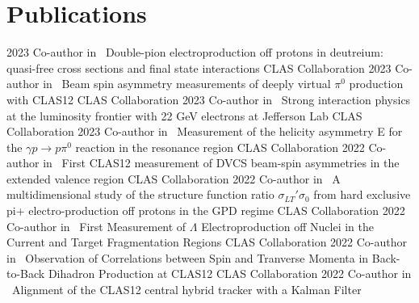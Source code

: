 \documentclass[a4paper]{cv-style}
\begin{document}
\section{Publications}
    \begin{entrylist}
        \entry
            {2023}
            {{\normalfont Co-author in} ~Double-pion electroproduction off protons in deutreium: quasi-free cross sections and final state interactions}
            {CLAS Collaboration}
            {\vspace{-0.3cm}}
        \entry
            {2023}
            {{\normalfont Co-author in} ~Beam spin asymmetry measurements of deeply virtual $\pi^0$ production with CLAS12}
            {CLAS Collaboration}
            {\vspace{-0.3cm}}
        \entry
            {2023}
            {{\normalfont Co-author in} ~Strong interaction physics at the luminosity frontier with 22 GeV electrons at Jefferson Lab}
            {CLAS Collaboration}
            {\vspace{-0.3cm}}
        \entry
            {2023}
            {{\normalfont Co-author in} ~Measurement of the helicity asymmetry E for the $\gamma p \rightarrow p\pi^0$ reaction in the resonance region}
            {CLAS Collaboration}
            {\vspace{-0.3cm}}
        \entry
            {2022}
            {{\normalfont Co-author in} ~First CLAS12 measurement of DVCS beam-spin asymmetries in the extended valence region}
            {CLAS Collaboration}
            {\vspace{-0.3cm}}
        \entry
            {2022}
            {{\normalfont Co-author in} ~A multidimensional study of the structure function ratio $\sigma_{LT}'\sigma_0$ from hard exclusive pi+ electro-production off protons in the GPD regime}
            {CLAS Collaboration}
            {\vspace{-0.3cm}}
        \entry
            {2022}
            {{\normalfont Co-author in} ~First Measurement of $\Lambda$ Electroproduction off Nuclei in the Current and Target Fragmentation Regions}
            {CLAS Collaboration}
            {\vspace{-0.3cm}}
        \entry
            {2022}
            {{\normalfont Co-author in} ~Observation of Correlations between Spin and Tranverse Momenta in Back-to-Back Dihadron Production at CLAS12}
            {CLAS Collaboration}
            {\vspace{-0.3cm}}
        \entry
            {2022}
            {{\normalfont Co-author in} ~Alignment of the CLAS12 central hybrid tracker with a Kalman Filter \hspace{1.5cm}}

\end{entrylist}
\end{document}
